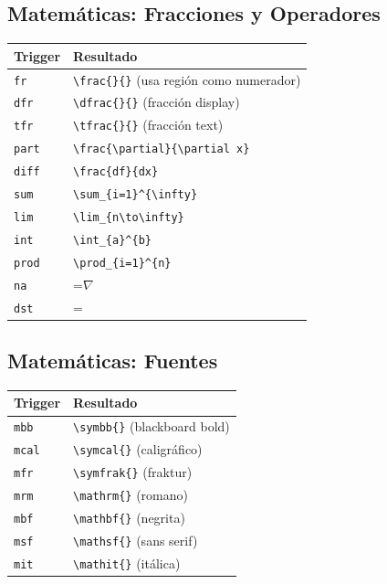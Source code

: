 \documentclass[11pt]{article}
\begin{document}
\subsection{Matemáticas: Fracciones y Operadores}
\label{sec:orge1e5066}
\begin{center}
\begin{tabular}{ll}
Trigger & Resultado\\
\hline
\texttt{fr} & \texttt{\textbackslash{}frac\{\}\{\}} (usa región como numerador)\\
\texttt{dfr} & \texttt{\textbackslash{}dfrac\{\}\{\}} (fracción display)\\
\texttt{tfr} & \texttt{\textbackslash{}tfrac\{\}\{\}} (fracción text)\\
\texttt{part} & \texttt{\textbackslash{}frac\{\textbackslash{}partial\}\{\textbackslash{}partial x\}}\\
\texttt{diff} & \texttt{\textbackslash{}frac\{df\}\{dx\}}\\
\texttt{sum} & \texttt{\textbackslash{}sum\_\{i=1\}\textasciicircum{}\{\textbackslash{}infty\}}\\
\texttt{lim} & \texttt{\textbackslash{}lim\_\{n\textbackslash{}to\textbackslash{}infty\}}\\
\texttt{int} & \texttt{\textbackslash{}int\_\{a\}\textasciicircum{}\{b\}}\\
\texttt{prod} & \texttt{\textbackslash{}prod\_\{i=1\}\textasciicircum{}\{n\}}\\
\texttt{na} & =\(\nabla\)\\
\texttt{dst} & =\displaystyle\\
\end{tabular}
\end{center}
\subsection{Matemáticas: Fuentes}
\label{sec:orgc27bcf4}
\begin{center}
\begin{tabular}{ll}
Trigger & Resultado\\
\hline
\texttt{mbb} & \texttt{\textbackslash{}symbb\{\}} (blackboard bold)\\
\texttt{mcal} & \texttt{\textbackslash{}symcal\{\}} (caligráfico)\\
\texttt{mfr} & \texttt{\textbackslash{}symfrak\{\}} (fraktur)\\
\texttt{mrm} & \texttt{\textbackslash{}mathrm\{\}} (romano)\\
\texttt{mbf} & \texttt{\textbackslash{}mathbf\{\}} (negrita)\\
\texttt{msf} & \texttt{\textbackslash{}mathsf\{\}} (sans serif)\\
\texttt{mit} & \texttt{\textbackslash{}mathit\{\}} (itálica)\\
\end{tabular}
\end{center}
\end{document}
